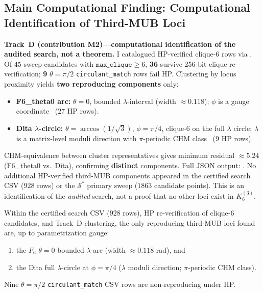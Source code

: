 \documentclass[onecolumn]{IEEEtran}
\begin{document}
\subsection{Main Computational Finding: Computational Identification of Third-MUB Loci}
\label{sec:trackd}
\textbf{Track~D (contribution M2)---computational identification of the audited search, not a theorem.}
I catalogued HP-verified clique-$6$ rows via .
Of $45$ sweep candidates with $\texttt{max\_clique}\ge6$, \textbf{36} survive 256-bit clique re-verification; \textbf{9} $\theta=\pi/2$ \texttt{circulant\_match} rows fail HP.
Clustering by locus proximity yields \textbf{two reproducing components} only:
\begin{itemize}
    \item \textbf{F6\_theta0 arc:} $\theta=0$, bounded $\lambda$-interval (width $\approx0.118$); $\phi$ is a gauge coordinate~\cite{JaupiTheorems2026} ($27$ HP rows).
    \item \textbf{Dita $\lambda$-circle:} $\theta=\arccos(1/\sqrt{3})$, $\phi=\pi/4$, clique-$6$ on the full $\lambda$ circle; $\lambda$ is a matrix-level moduli direction with $\pi$-periodic CHM class~\cite{JaupiTheorems2026} ($9$ HP rows).
\end{itemize}
CHM-equivalence between cluster representatives gives minimum residual $\approx5.24$ (F6\_theta0 vs.\ Dita), confirming \textbf{distinct} components.
Full JSON output: .
No additional HP-verified third-MUB components appeared in the certified search CSV ($928$ rows) or the $\mathcal{S}^*$ primary sweep ($1863$ candidate points).
This is an identification of the \emph{audited} search, not a proof that no other loci exist in $K_6^{(3)}$.

\begin{finding}
\label{thm:trackd}
Within the certified search CSV ($928$ rows), HP re-verification of clique-$6$ candidates, and Track~D clustering, the only reproducing third-MUB loci found are, up to parametrization gauge:
\begin{enumerate}
    \item the $F_6$ $\theta{=}0$ bounded $\lambda$-arc (width $\approx0.118$ rad), and
    \item the Dita full $\lambda$-circle at $\phi=\pi/4$ ($\lambda$ moduli direction; $\pi$-periodic CHM class).
\end{enumerate}
Nine $\theta=\pi/2$ \texttt{circulant\_match} CSV rows are non-reproducing under HP.
\end{finding}
\end{document}
